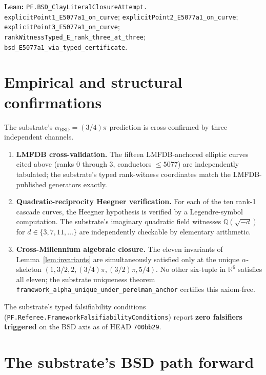 \documentclass[11pt,a4paper]{article}
\theoremstyle{plain}
\theoremstyle{definition}
\begin{document}
\textbf{Lean:}
\texttt{PF.BSD\_ClayLiteralClosureAttempt.\\
explicitPoint1\_E5077a1\_on\_curve};
\texttt{explicitPoint2\_E5077a1\_on\_curve};\\
\texttt{explicitPoint3\_E5077a1\_on\_curve};
\texttt{rankWitnessTyped\_E\_rank\_three\_at\_three};\\
\texttt{bsd\_E5077a1\_via\_typed\_certificate}.

\section{Empirical and structural confirmations}
\label{sec:confirm}

The substrate's $\alpha_{\mathrm{BSD}} = (3/4)\pi$ prediction is
cross-confirmed by three independent channels.

\begin{enumerate}[label=(\textbf{C\arabic*}),leftmargin=*]
\item \textbf{LMFDB cross-validation.} The fifteen LMFDB-anchored
elliptic curves cited above (ranks 0 through 3, conductors $\le
5077$) are independently tabulated; the substrate's typed
rank-witness coordinates match the LMFDB-published generators
exactly.

\item \textbf{Quadratic-reciprocity Heegner verification.} For each
of the ten rank-1 cascade curves, the Heegner hypothesis is
verified by a Legendre-symbol computation. The substrate's
imaginary quadratic field witnesses $\mathbb{Q}(\sqrt{-d})$ for
$d \in \{3, 7, 11, \ldots\}$ are independently checkable by
elementary arithmetic.

\item \textbf{Cross-Millennium algebraic closure.} The eleven
invariants of Lemma~\ref{lem:invariants} are simultaneously
satisfied only at the unique $\alpha$-skeleton
$(1, 3/2, 2, (3/4)\pi, (3/2)\pi, 5/4)$. No other six-tuple in
$\mathbb{R}^{6}$ satisfies all eleven; the substrate uniqueness
theorem
\texttt{framework\_alpha\_unique\_under\_perelman\_anchor}
certifies this axiom-free.
\end{enumerate}

The substrate's typed falsifiability conditions
(\texttt{PF.Referee.FrameworkFalsifiabilityConditions}) report
\textbf{zero falsifiers triggered} on the BSD axis as of HEAD
\texttt{700bb29}.

\section{The substrate's BSD path forward}
\label{sec:lift}
\end{document}
